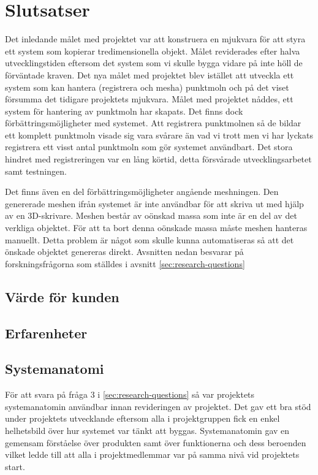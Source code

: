 \chapter{Slutsatser}
\label{cha:conclusion}
Det inledande målet med projektet var att konstruera en mjukvara för att styra ett system som kopierar tredimensionella objekt. Målet reviderades efter halva utvecklingstiden eftersom det system som vi skulle bygga vidare på inte höll de förväntade kraven. Det nya målet med projektet blev istället att utveckla ett system som kan hantera (registrera och mesha) punktmoln och på det viset försumma det tidigare projektets mjukvara. Målet med projektet nåddes, ett system för hantering av punktmoln har skapats. Det finns dock förbättringsmöjligheter med systemet. Att registrera punktmolnen så de bildar ett komplett punktmoln visade sig vara svårare än vad vi trott men vi har lyckats registrera ett visst antal punktmoln som gör systemet användbart. Det stora hindret med registreringen var en lång körtid, detta försvårade utvecklingsarbetet samt testningen. 

Det finns även en del förbättringsmöjligheter angående meshningen. Den genererade meshen ifrån systemet är inte användbar för att skriva ut med hjälp av en 3D-skrivare. Meshen består av oönskad massa som inte är en del av det verkliga objektet. För att ta bort denna oönskade massa måste meshen hanteras manuellt. Detta problem är något som skulle kunna automatiseras så att det önskade objektet genereras direkt. Avsnitten nedan besvarar på forskningsfrågorna som ställdes i avsnitt \ref{sec:research-questions}

\section{Värde för kunden}
\section{Erfarenheter}
\section{Systemanatomi}
För att svara på fråga 3 i \ref{sec:research-questions} så var projektets systemanatomin användbar innan revideringen av projektet. Det gav ett bra stöd under projektets utvecklande eftersom alla i projektgruppen fick en enkel helhetsbild över hur systemet var tänkt att byggas. Systemanatomin gav en gemensam förståelse över produkten samt över funktionerna och dess beroenden vilket ledde till att alla i projektmedlemmar var på samma nivå vid projektets start.

